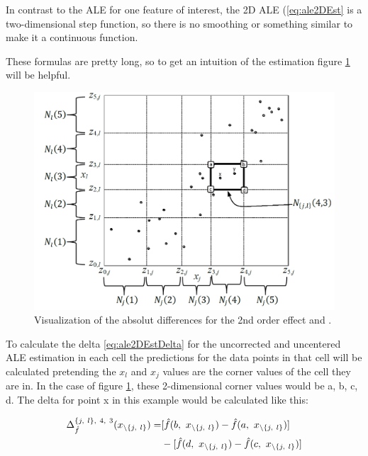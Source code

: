 \documentclass[]{krantz}
\begin{document}
In contrast to the ALE for one feature of interest, the 2D ALE
(\eqref{eq:ale2DEst} is a two-dimensional step function, so there is no
smoothing or something similar to make it a continuous function.

These formulas are pretty long, so to get an intuition of the estimation
figure \ref{fig:ale2DEstimation} will be helpful.

\begin{figure}
\includegraphics[width=1\linewidth]{images/ale_1_ALE_2D_estimation} \caption{Visualization of the absolut differences for
the 2nd order effect \citep[page 13]{Apley2016} and \citep{molnar2019}.}\label{fig:ale2DEstimation}
\end{figure}




To calculate the delta \eqref{eq:ale2DEstDelta} for the uncorrected and
uncentered ALE estimation in each cell the predictions for the data
points in that cell will be calculated pretending the \(x_l\) and
\(x_j\) values are the corner values of the cell they are in. In the
case of figure \ref{fig:ale2DEstimation}, these 2-dimensional corner
values would be a, b, c, d. The delta for point x in this example would
be calculated like this:

\begin{align}
\Delta_{\hat f}^{{\{j,~l\}}, ~4,~3} (x_{\setminus\{j,~l\}}) = 
& [\hat f(b, ~x_{\setminus\{j,~l\}}) - \hat f(a, ~x_{\setminus\{j,~l\}})] \notag \\
&- [\hat f(d, ~x_{\setminus\{j,~l\}}) - \hat f(c, ~x_{\setminus\{j,~l\}})] \notag
\end{align}
\end{document}
